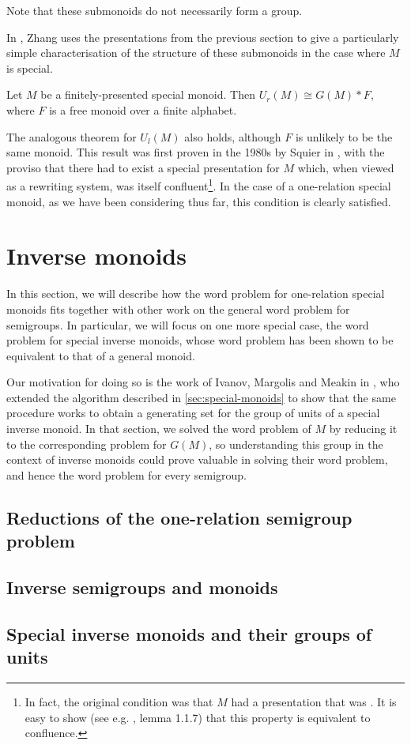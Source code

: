 \documentclass[noindex,noinsetproof,12pt]{lmaths}
\begin{document}
Note that these submonoids do not necessarily form a group.

In \cite{Zhang1992a}, Zhang uses the presentations from the previous section to give a particularly simple characterisation of the structure of these submonoids in the case where $M$ is special.
\begin{theorem}
	Let $M$ be a finitely-presented special monoid. Then $U_r(M) \cong G(M) \ast F$, where $F$ is a free monoid over a finite alphabet.
\end{theorem}

The analogous theorem for $U_l(M)$ also holds, although $F$ is unlikely to be the same monoid. This result was first proven in the 1980s by Squier in \cite{Squier1987}, with the proviso that there had to exist a special presentation for $M$ which, when viewed as a rewriting system, was itself confluent\footnote{In fact, the original condition was that $M$ had a presentation that was . It is easy to show (see e.g. \cite{Book1993}, lemma 1.1.7) that this property is equivalent to confluence.}. In the case of a one-relation special monoid, as we have been considering thus far, this condition is clearly satisfied.


\section{Inverse monoids}

In this section, we will describe how the word problem for one-relation special monoids fits together with other work on the general word problem for semigroups. In particular, we will focus on one more special case, the word problem for special inverse monoids, whose word problem has been shown to be equivalent to that of a general monoid.

Our motivation for doing so is the work of Ivanov, Margolis and Meakin in \cite{Ivanov2001}, who extended the algorithm described in \cref{sec:special-monoids} to show that the same procedure works to obtain a generating set for the group of units of a special inverse monoid. In that section, we solved the word problem of $M$ by reducing it to the corresponding problem for $G(M)$, so understanding this group in the context of inverse monoids could prove valuable in solving their word problem, and hence the word problem for every semigroup.

\subsection{Reductions of the one-relation semigroup problem}
\subsection{Inverse semigroups and monoids}
\subsection{Special inverse monoids and their groups of units}


\printbibliography

\printindex
\end{document}

